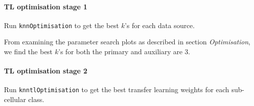 \paragraph{TL optimisation stage 1} Run \texttt{knnOptimisation} to get
the best $k$'s for each data source.

\begin{knitrout}
\color{fgcolor}\begin{kframe}
\begin{alltt}
 \hlkwb{<-}   \hlstd{=} \hlstd{)}
 \hlkwb{<-}   \hlstd{=} \hlstd{)}
\end{alltt}
\end{kframe}
\end{knitrout}

From examining the parameter search plots as described in section
\textit{Optimisation}, we find the best $k$'s for both the primary and
auxiliary are 3.

\paragraph{TL optimisation stage 2} Run \texttt{knntlOptimisation} to
get the best transfer learning weights for each sub-cellular class.

\begin{knitrout}
\color{fgcolor}\begin{kframe}
\begin{alltt}
 \hlkwb{<-} \hlstd{(}\hlstd{,}  \hlstd{=} \hlstd{)}

 \hlkwb{<-}   \hlstd{=} \hlstd{,}
                            \hlstd{=} \hlstd{,}  \hlstd{=} \hlstd{,}
                            \hlstd{=} \hlstd{,}  \hlstd{=} \hlstd{(}\hlstd{,} \hlstd{),}
                            
\end{alltt}
\end{kframe}
\end{knitrout}

